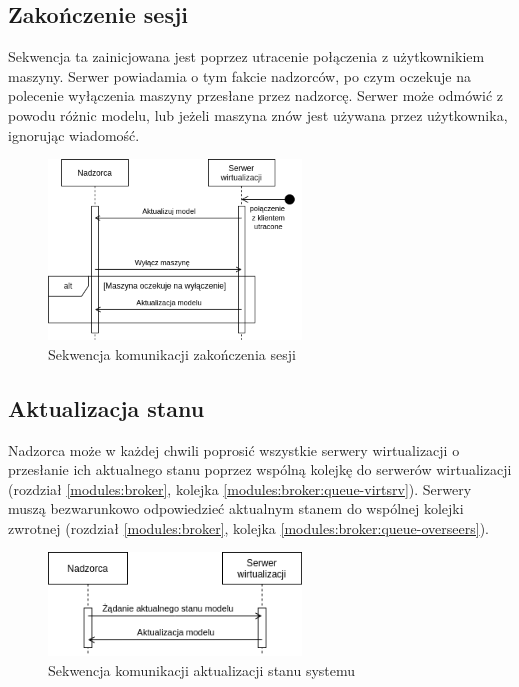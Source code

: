 \documentclass[../opis-rozwiazania.tex]{subfiles}
\begin{document}
\subsection{Zakończenie sesji}

Sekwencja ta zainicjowana jest poprzez utracenie połączenia z użytkownikiem maszyny.
Serwer powiadamia o tym fakcie nadzorców, po czym oczekuje na polecenie wyłączenia maszyny przesłane przez nadzorcę. Serwer może odmówić z powodu różnic modelu, lub jeżeli maszyna znów jest używana przez użytkownika, ignorując wiadomość.

\begin{figure}[H]
  \centering
  \includegraphics[width=0.6\textwidth]{../diagrams/sequence_diagrams/konczenie_sesji.png}
  \caption{Sekwencja komunikacji zakończenia sesji}
  \label{figure:diagrams:sequence_diagrams:konczenie_sesji}
\end{figure}

\subsection{Aktualizacja stanu}

Nadzorca może w każdej chwili poprosić wszystkie serwery wirtualizacji
o przesłanie ich aktualnego stanu poprzez wspólną kolejkę do serwerów wirtualizacji (rozdział \ref{modules:broker}, kolejka \ref{modules:broker:queue-virtsrv}).
Serwery muszą bezwarunkowo odpowiedzieć aktualnym stanem do wspólnej kolejki zwrotnej (rozdział \ref{modules:broker}, kolejka \ref{modules:broker:queue-overseers}).

\begin{figure}[H]
  \centering
  \includegraphics[width=0.6\textwidth]{../diagrams/sequence_diagrams/aktualizacja_stanu.png}
  \caption{Sekwencja komunikacji aktualizacji stanu systemu}
  \label{figure:diagrams:sequence_diagrams:aktualizacja_stanu}
\end{figure}
\end{document}
